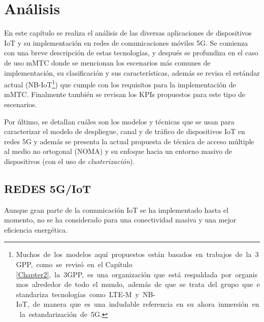
\chapter{Análisis} %


\label{Chapter4} %

En este capítulo se realiza el análisis de las diversas aplicaciones de dispositivos IoT y su implementación en redes de comunicaciones móviles 5G. Se comienza con una breve descripción de estas tecnologías, y después se profundiza en el caso de uso mMTC donde se mencionan los escenarios más comunes de implementación, su clasificación y sus características, además se revisa el estándar actual (NB-IoT\footnote{ Muchos\ de\ los\ modelos\ aqu\textrm{í}\ propuestos\ est\textrm{á}n\ basados\ en\ trabajos\ de\ la\ 3GPP,\ como\ se\ revis\textrm{ó}\ en\ el Capítulo \ref{Chapter2},\ la\ 3GPP,\ es\ una\ organizaci\textrm{ó}n\ que\ est\textrm{á}\ respaldada\ por\ organismos\ alrededor\ de\ todo\ el\ mundo,\ adem\textrm{á}s\ de\ que\ se\ trata\ del\ grupo\ que\ estandariza\ tecnolog\textrm{í}as\ como\ LTE-M\ y\ NB-IoT,\ de\ manera\ que\ es\ una\ indudable\ referencia\ en\ su\ ahora\ inmersi\textrm{ó}n\ en\ la\ estandarizaci\textrm{ó}n\ de\ 5G.}) que cumple con los requisitos para la implementación de mMTC. Finalmente también se revisan los KPIs propuestos para este tipo de escenarios.\newline

Por último, se detallan cuáles son los modelos y técnicas que se usan para caracterizar el modelo de despliegue, canal y de tráfico de dispositivos IoT en redes 5G y además se presenta la actual propuesta de técnica de acceso múltiple al medio no ortogonal (NOMA) y su enfoque hacia un entorno masivo de dispositivos (con el uso de \textit{clusterización}).


\section{REDES 5G/IoT}

Aunque gran parte de la comunicación IoT se ha implementado hasta el momento, no se ha considerado para una conectividad masiva y una mejor eficiencia energética. \newline

